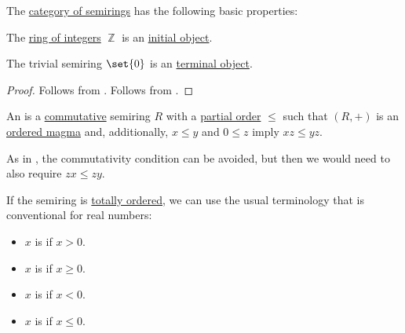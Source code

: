 \begin{proposition}\label{thm:category_of_semirings_properties}
  The \hyperref[def:semiring/category]{category of semirings} has the following basic properties:
  \begin{thmenum}
     The \hyperref[def:set_of_integers]{ring of integers} \( \BbbZ \) is an \hyperref[def:universal_objects/initial]{initial object}.

     The trivial semiring \( \set{ 0 } \) is an \hyperref[def:universal_objects/terminal]{terminal object}.
  \end{thmenum}
\end{proposition}
\begin{proof}
   Follows from .
   Follows from .
\end{proof}

\begin{definition}\label{def:ordered_semiring}
  An  is a \hyperref[def:magma/commutative]{commutative} semiring \( R \) with a \hyperref[def:partially_ordered_set]{partial order} \( \leq \) such that \( (R, +) \) is an \hyperref[def:ordered_magma]{ordered magma} and, additionally, \( x \leq y \) and \( 0 \leq z \) imply \( xz \leq yz \).

  As in , the commutativity condition can be avoided, but then we would need to also require \( zx \leq zy \).

  If the semiring is \hyperref[def:totally_ordered_set]{totally ordered}, we can use the usual terminology that is conventional for real numbers:
  \begin{itemize}
    \item \( x \) is  if \( x > 0 \).
    \item \( x \) is  if \( x \geq 0 \).
    \item \( x \) is  if \( x < 0 \).
    \item \( x \) is  if \( x \leq 0 \).
  \end{itemize}
\end{definition}

